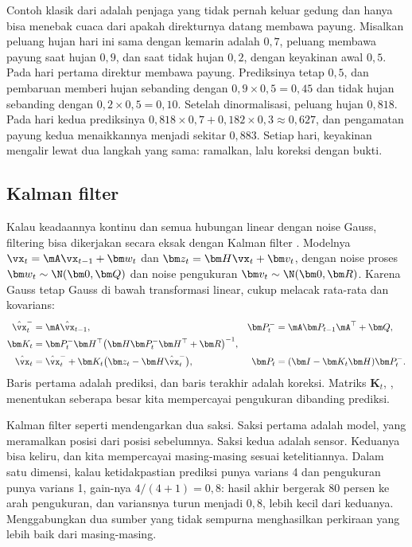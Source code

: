 Contoh klasik dari \citet{russell2021} adalah penjaga yang tidak pernah keluar gedung dan hanya bisa
menebak cuaca dari apakah direkturnya datang membawa payung. Misalkan peluang hujan hari ini sama
dengan kemarin adalah $0{,}7$, peluang membawa payung saat hujan $0{,}9$, dan saat tidak hujan
$0{,}2$, dengan keyakinan awal $0{,}5$. Pada hari pertama direktur membawa payung. Prediksinya tetap
$0{,}5$, dan pembaruan memberi hujan sebanding dengan $0{,}9\times0{,}5=0{,}45$ dan tidak hujan
sebanding dengan $0{,}2\times0{,}5=0{,}10$. Setelah dinormalisasi, peluang hujan $0{,}818$. Pada hari
kedua prediksinya $0{,}818\times0{,}7+0{,}182\times0{,}3\approx0{,}627$, dan pengamatan payung kedua
menaikkannya menjadi sekitar $0{,}883$. Setiap hari, keyakinan mengalir lewat dua langkah yang sama:
ramalkan, lalu koreksi dengan bukti.

\subsection{Kalman filter}

Kalau keadaannya kontinu dan semua hubungan linear dengan noise Gauss, filtering bisa dikerjakan
secara eksak dengan Kalman filter \citep{kalman1960}. Modelnya
$\vx_t=\mA\vx_{t-1}+\bm w_t$ dan $\bm z_t=\bm H\vx_t+\bm v_t$, dengan noise proses
$\bm w_t\sim\N(\bm0,\bm Q)$ dan noise pengukuran $\bm v_t\sim\N(\bm0,\bm R)$. Karena Gauss tetap Gauss di
bawah transformasi linear, cukup melacak rata-rata dan kovarians:
\begin{equation}
\begin{aligned}
\hat\vx^-_t&=\mA\hat\vx_{t-1}, & \bm P^-_t&=\mA\bm P_{t-1}\mA^\top+\bm Q,\\
\bm K_t&=\bm P^-_t\bm H^\top\big(\bm H\bm P^-_t\bm H^\top+\bm R\big)^{-1}, &&\\
\hat\vx_t&=\hat\vx^-_t+\bm K_t\big(\bm z_t-\bm H\hat\vx^-_t\big), & \bm P_t&=(\bm I-\bm K_t\bm H)\bm P^-_t.
\end{aligned}
\end{equation}
Baris pertama adalah prediksi, dan baris terakhir adalah koreksi. Matriks $\bm K_t$, ,
menentukan seberapa besar kita mempercayai pengukuran dibanding prediksi.

Kalman filter seperti mendengarkan dua saksi. Saksi pertama adalah model, yang meramalkan posisi
dari posisi sebelumnya. Saksi kedua adalah sensor. Keduanya bisa keliru, dan kita mempercayai
masing-masing sesuai ketelitiannya. Dalam satu dimensi, kalau ketidakpastian prediksi punya varians
4 dan pengukuran punya varians 1, gain-nya $4/(4+1)=0{,}8$: hasil akhir bergerak 80 persen ke arah
pengukuran, dan variansnya turun menjadi $0{,}8$, lebih kecil dari keduanya. Menggabungkan dua sumber
yang tidak sempurna menghasilkan perkiraan yang lebih baik dari masing-masing.

